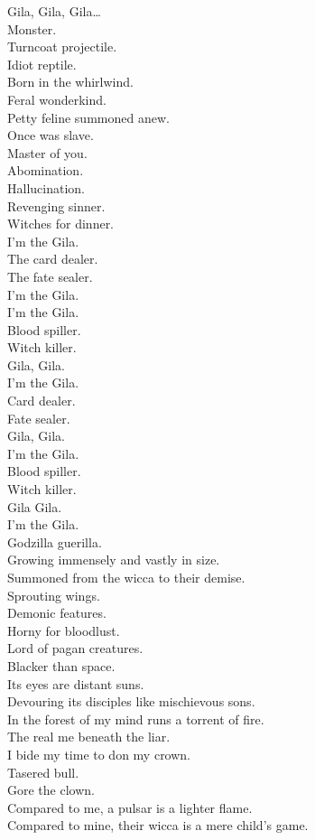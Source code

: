 Gila, Gila, Gila… \\
Monster. \\

Turncoat projectile. \\
Idiot reptile. \\
Born in the whirlwind. \\
Feral wonderkind. \\
Petty feline summoned anew. \\
Once was slave. \\
Master of you. \\
Abomination. \\
Hallucination. \\
Revenging sinner. \\
Witches for dinner. \\
I'm the Gila. \\
The card dealer. \\
The fate sealer. \\
I'm the Gila. \\

I'm the Gila. \\
Blood spiller. \\
Witch killer. \\
Gila, Gila. \\
I'm the Gila. \\
Card dealer. \\
Fate sealer. \\
Gila, Gila. \\
I'm the Gila. \\
Blood spiller. \\
Witch killer. \\
Gila Gila. \\
I'm the Gila. \\
Godzilla guerilla. \\

Growing immensely and vastly in size. \\
Summoned from the wicca to their demise. \\
Sprouting wings. \\
Demonic features. \\
Horny for bloodlust. \\
Lord of pagan creatures. \\
Blacker than space. \\
Its eyes are distant suns. \\
Devouring its disciples like mischievous sons. \\
In the forest of my mind runs a torrent of fire. \\
The real me beneath the liar. \\
I bide my time to don my crown. \\
Tasered bull. \\
Gore the clown. \\
Compared to me, a pulsar is a lighter flame. \\
Compared to mine, their wicca is a mere child's game. \\

